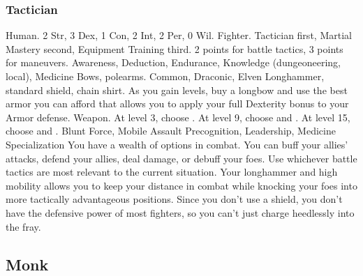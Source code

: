         \subsubsection{Tactician}
             Human.
             2 Str, 3 Dex, 1 Con, 2 Int, 2 Per, 0 Wil.
             Fighter.
             Tactician first, Martial Mastery second, Equipment Training third.
             2 points for battle tactics, 3 points for maneuvers.
             Awareness, Deduction, Endurance, Knowledge (dungeoneering, local), Medicine
             Bows, polearms.
             Common, Draconic, Elven
             Longhammer, standard shield, chain shirt. As you gain levels, buy a longbow and use the best armor you can afford that allows you to apply your full Dexterity bonus to your Armor defense.
             Weapon.
                At level 3, choose .
                At level 9, choose  and .
                At level 15, choose  and .
             Blunt Force, Mobile Assault
             Precognition, Leadership, Medicine Specialization
             You have a wealth of options in combat.
            You can buff your allies' attacks, defend your allies, deal damage, or debuff your foes.
            Use whichever battle tactics are most relevant to the current situation.
            Your longhammer and high mobility allows you to keep your distance in combat while knocking your foes into more tactically advantageous positions.
            Since you don't use a shield, you don't have the defensive power of most fighters, so you can't just charge heedlessly into the fray.

    \subsection{Monk}


